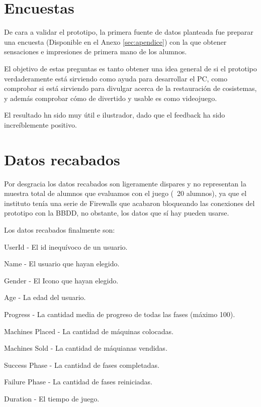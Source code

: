 \section{Encuestas}

De cara a validar el prototipo, la primera fuente de datos planteada fue preparar una encuesta (Disponible en el Anexo \ref{sec:apendice}) con la que obtener sensaciones e impresiones de primera mano de los alumnos.

El objetivo de estas preguntas es tanto obtener una idea general de si el prototipo verdaderamente está sirviendo como ayuda para desarrollar el PC, como comprobar si está sirviendo para divulgar acerca de la restauración de cosistemas, y además comprobar cómo de divertido y usable es como videojuego.

El resultado hn sido muy útil e ilustrador, dado que el feedback ha sido increíblemente positivo. 

\section{Datos recabados}

Por desgracia los datos recabados son ligeramente dispares y no representan la muestra total de alumnos que evaluamos con el juego (~20 alumnos), ya que el instituto tenía una serie de Firewalls que acabaron bloqueando las conexiones del prototipo con la BBDD, no obstante, los datos que sí hay pueden usarse.

Los datos recabados finalmente son:

\begin{compactitem}
    \item User\textunderscore Id - El id inequívoco de un usuario.
    \item Name - El usuario que hayan elegido.
    \item Gender - El Icono que hayan elegido.
    \item Age - La edad del usuario.
    \item Progress - La cantidad media de progreso de todas las fases (máximo 100).
    \item Machines Placed - La cantidad de máquinas colocadas.
    \item Machines Sold - La cantidad de máquianas vendidas.
    \item Success Phase - La cantidad de fases completadas.
    \item Failure Phase - La cantidad de fases reiniciadas.
    \item Duration - El tiempo de juego.
\end{compactitem}

